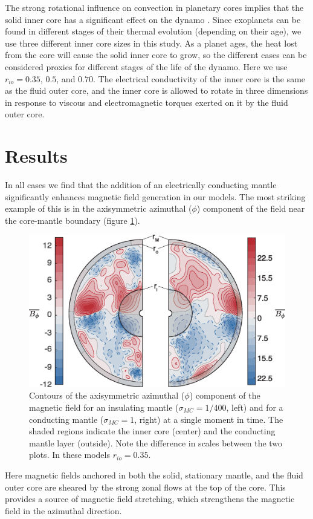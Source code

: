 The strong rotational influence on convection in planetary cores implies that the solid inner core has a significant effect on the dynamo \citep{heimpel2005, stanleyfluxspot}. Since exoplanets can be found in  different stages of their thermal evolution (depending on their age), we use three different inner core sizes in this study. As a planet ages, the heat lost from the core will cause the solid inner core to grow, so the different cases can be considered proxies for different stages of the life of the dynamo. Here we use $r_{io}=0.35$, $0.5$, and $0.70$. The electrical conductivity of the inner core is the same as the fluid outer core, and the inner core is allowed to rotate in three dimensions in response to viscous and electromagnetic torques exerted on it by the fluid outer core.

\section{Results}
In all cases we find that the addition of an electrically conducting mantle significantly enhances magnetic field generation in our models. The most striking example of this is in the axisymmetric azimuthal ($\phi$) component of the field near the core-mantle boundary (figure \ref{fig:toroidal}).
\begin{figure}
\centering \noindent\includegraphics[width=.8\linewidth]{Chapter3/Figures/f2.eps}
\caption{Contours of the axisymmetric azimuthal ($\phi$) component of the magnetic field for an insulating mantle ($\sigma_{MC}=1/400$, left) and for a conducting mantle ($\sigma_{MC}=1$, right) at a single moment in time. The shaded regions indicate the inner core (center) and the conducting mantle layer (outside). Note the difference in scales between the two plots. In these models $r_{io}=0.35$.}
\label{fig:toroidal}
\end{figure}
Here magnetic fields anchored in both the solid, stationary mantle, and the fluid outer core are sheared by the strong zonal flows at the top of the core. This provides a source of magnetic field stretching, which strengthens the magnetic field in the azimuthal direction.

